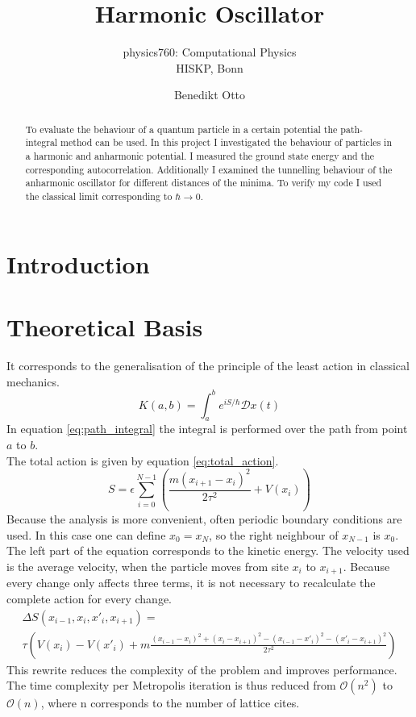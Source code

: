 \documentclass{scrartcl}
\title{Harmonic Oscillator}
\author{Benedikt Otto}
\subtitle{physics760: Computational Physics\\HISKP, Bonn}
\begin{document}
	\maketitle
	\newpage
	\tableofcontents
	\newpage
	\begin{abstract}
		To evaluate the behaviour of a quantum particle in a certain potential the path-integral method can be used.
		In this project I investigated the behaviour of particles in a harmonic and anharmonic potential.
		I measured the ground state energy and the corresponding autocorrelation.
		Additionally I examined the tunnelling behaviour of the anharmonic oscillator for different distances of the minima.
		To verify my code I used the classical limit corresponding to $\hbar \rightarrow 0$.
	\end{abstract}
	\section{Introduction}
	\section{Theoretical Basis}
		It corresponds to the generalisation of the principle of the least action in classical mechanics.
		\begin{equation}
			K(a, b) = \int_a^b e^{iS/\hbar} \mathcal Dx(t)
			\label{eq:path_integral}
		\end{equation}
		In equation \ref{eq:path_integral} the integral is performed over the path from point $a$ to $b$.
		\\
		The total action is given by equation \ref{eq:total_action}.
		\begin{equation}
			S = \epsilon \sum_{i=0}^{N - 1} \left(\frac{m(x_{i+1} - x_i)^2}{2\tau^2} + V(x_i)\right)
			\label{eq:total_action}
		\end{equation}
		Because the analysis is more convenient, often periodic boundary conditions are used.
		In this case one can define $x_0 = x_N$, so the right neighbour of $x_{N-1}$ is $x_0$.
		The left part of the equation corresponds to the kinetic energy.
		The velocity used is the average velocity, when the particle moves from site $x_i$ to $x_{i+1}$.
		Because every change only affects three terms, it is not necessary to recalculate the complete action for every change.
		\begin{equation}
			\begin{split}
				\Delta S(x_{i-1}, x_i, x'_i, x_{i+1}) =\\
				\tau\left(V(x_i) - V(x'_i) + m\frac{(x_{i-1} - x_i)^2 + (x_i - x_{i+1})^2 - (x_{i-1} - x'_i)^2 - (x'_i - x_{i+1})^2}{2\tau^2}\right)
			\end{split}
			\label{eq:delta_total_action}
		\end{equation}
		This rewrite reduces the complexity of the problem and improves performance.
		The time complexity per Metropolis iteration is thus reduced from $\mathcal O(n^2)$ to $\mathcal O(n)$, where n corresponds to the number of lattice cites.
\end{document}
